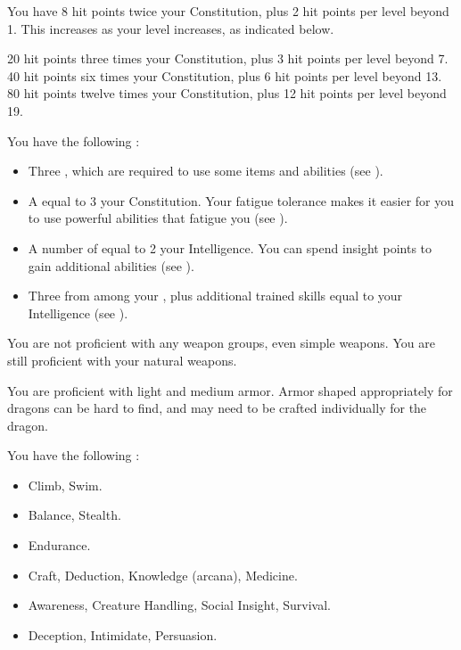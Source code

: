             You have 8 hit points \add twice your Constitution, plus 2 hit points per level beyond 1.
            This increases as your level increases, as indicated below.
            \begin{itemize}
                 20 hit points \add three times your Constitution, plus 3 hit points per level beyond 7.
                 40 hit points \add six times your Constitution, plus 6 hit points per level beyond 13.
                 80 hit points \add twelve times your Constitution, plus 12 hit points per level beyond 19.
            \end{itemize}

         You have the following :
        \begin{itemize}
            \item Three , which are required to use some items and abilities (see ).
            \item A  equal to 3 \add your Constitution.
                Your fatigue tolerance makes it easier for you to use powerful abilities that fatigue you (see ).
            \item A number of  equal to 2 \add your Intelligence.
                You can spend insight points to gain additional abilities (see ).
            \item Three  from among your , plus additional trained skills equal to your Intelligence (see ).
        \end{itemize}

        You are not proficient with any weapon groups, even simple weapons.
        You are still proficient with your natural weapons.

        You are proficient with light and medium armor.
        Armor shaped appropriately for dragons can be hard to find, and may need to be crafted individually for the dragon.

        You have the following :
        \begin{itemize}
            \item {} Climb, Swim.
            \item {} Balance, Stealth.
            \item {} Endurance.
            \item {} Craft, Deduction, Knowledge (arcana), Medicine.
            \item {} Awareness, Creature Handling, Social Insight, Survival.
            \item {} Deception, Intimidate, Persuasion.
        \end{itemize}

